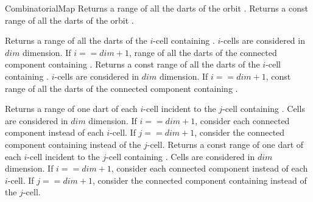 \begin{ccRefConcept}{CombinatorialMap}
   {Returns a range of all the darts of the orbit .
     }
\ccGlue
{}
   {Returns a const range of all the darts of the orbit .
   }

   {Returns a range of all the darts of the $i$-cell containing .
    $i$-cells are considered in $dim$ dimension. If $i==dim+1$,  
    range of all the darts of the connected component containing .
  }
\ccGlue
{}
   {Returns a const range of all the darts of the $i$-cell containing .
    $i$-cells are considered in $dim$ dimension. If $i==dim+1$,  
    const range of all the darts of the connected component containing .
   }

   {Returns a range of one dart of each $i$-cell incident to the $j$-cell 
     containing . Cells are considered in $dim$ dimension. If $i==dim+1$,  
     consider each connected component instead of each $i$-cell. If $j==dim+1$,
     consider the connected component containing  instead of the $j$-cell.
     }
\ccGlue
{}
   {Returns a const range of one dart of each $i$-cell incident to the $j$-cell 
     containing . Cells are considered in $dim$ dimension. If $i==dim+1$,  
     consider each connected component instead of each $i$-cell. If $j==dim+1$,
     consider the connected component containing  instead of the $j$-cell.
     }


\end{ccRefConcept}
